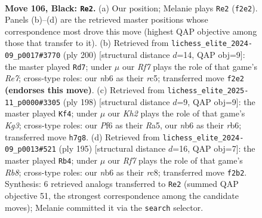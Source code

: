 \documentclass[11pt]{article}
\begin{document}
\clearpage

\begin{figure}[p]\centering
\begin{subfigure}{0.46\textwidth}\centering
\resizebox{\linewidth}{!}{%
\newchessgame
\chessboard[
  setfen={8/6pk/1N3p2/7p/7P/R5PK/5r2/8 b - - 37 106},
  showmover=false,
  pgfstyle=straightmove, color=movearrow, markmove={f2-e2}
]}
\caption{}
\end{subfigure}\hfill
\begin{subfigure}{0.46\textwidth}\centering
\resizebox{\linewidth}{!}{%
\newchessgame
\chessboard[
  setfen={8/4R3/6pk/2r4p/7P/6PK/8/8 w - - 38 101},
  showmover=false,
  pgfstyle=straightmove, color=movearrow, markmove={e7-d7}
]}
\caption{}
\end{subfigure}
\\[4pt]
\begin{subfigure}{0.46\textwidth}\centering
\resizebox{\linewidth}{!}{%
\newchessgame
\chessboard[
  setfen={8/6pk/1r5p/R6P/6P1/6K1/8/8 w - - 55 100},
  showmover=false,
  pgfstyle=straightmove, color=movearrow, markmove={g3-f4}
]}
\caption{}
\end{subfigure}\hfill
\begin{subfigure}{0.46\textwidth}\centering
\resizebox{\linewidth}{!}{%
\newchessgame
\chessboard[
  setfen={2R5/8/6pk/7p/7P/5PP1/5K2/1r6 b - - 6 98},
  showmover=false,
  pgfstyle=straightmove, color=movearrow, markmove={b1-b4}
]}
\caption{}
\end{subfigure}
\caption{\textbf{Move 106, Black: \texttt{Re2}.} (a) Our position; Melanie plays \texttt{Re2} (\texttt{f2e2}). Panels (b)--(d) are the retrieved master positions whose correspondence most drove this move (highest QAP objective among those that transfer to it). (b) Retrieved from \texttt{lichess\_elite\_2024-09\_p0017\#3770} (ply 200) [structural distance $d$=14, QAP obj=9]: the master played \texttt{Rd7}; under $\mu$ our \emph{Rf7} plays the role of that game's \emph{Re7}; cross-type roles: our \emph{n}b6 as their \emph{r}c5; transferred move \texttt{f2e2} \textbf{(endorses this move)}. (c) Retrieved from \texttt{lichess\_elite\_2025-11\_p0000\#3305} (ply 198) [structural distance $d$=9, QAP obj=9]: the master played \texttt{Kf4}; under $\mu$ our \emph{Kh2} plays the role of that game's \emph{Kg3}; cross-type roles: our \emph{P}f6 as their \emph{R}a5, our \emph{n}b6 as their \emph{r}b6; transferred move \texttt{h7g8}. (d) Retrieved from \texttt{lichess\_elite\_2024-09\_p0013\#521} (ply 195) [structural distance $d$=16, QAP obj=7]: the master played \texttt{Rb4}; under $\mu$ our \emph{Rf7} plays the role of that game's \emph{Rb8}; cross-type roles: our \emph{n}b6 as their \emph{r}c8; transferred move \texttt{f2b2}. Synthesis: 6 retrieved analogs transferred to \texttt{Re2} (summed QAP objective 51, the strongest correspondence among the candidate moves); Melanie committed it via the \texttt{search} selector.}
\label{fig:thought-m211}
\end{figure}
\end{document}
